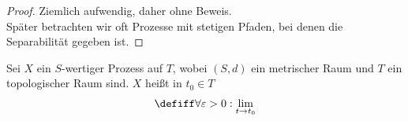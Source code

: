 \begin{proof}
	Ziemlich aufwendig, daher ohne Beweis.\\
	Später betrachten wir oft Prozesse mit stetigen Pfaden, bei denen die Separabilität gegeben ist.
\end{proof}

\begin{definition}\label{def2.1.8}
	Sei $X$ ein $S$-wertiger Prozess auf $T$, wobei $(S,d)$ ein metrischer Raum und $T$ ein topologischer Raum sind.
	$X$ heißt  in $t_0\in T$
	\begin{align*}
		\defiff\forall\varepsilon>0:\lim\limits_{t\to t_0}
	\end{align*}
\end{definition}
